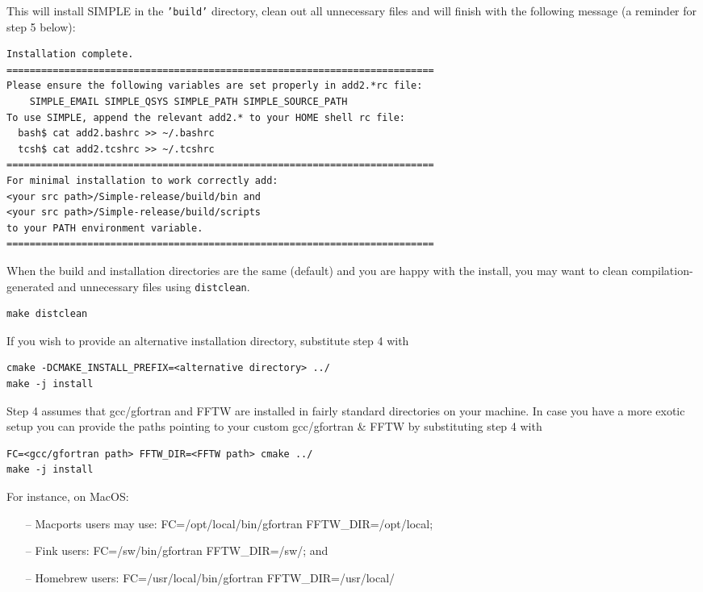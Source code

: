 \documentclass[a4paper,11pt]{article}
\begin{document}
\noindent{}This will install SIMPLE in the \texttt{'build'} directory, clean out all unnecessary
files and will finish with the following message (a reminder for step 5 below):

\begin{Verbatim}[commandchars=+\[\],fontsize=\small,breaklines=true]
Installation complete.
==========================================================================
Please ensure the following variables are set properly in add2.*rc file:
    SIMPLE_EMAIL SIMPLE_QSYS SIMPLE_PATH SIMPLE_SOURCE_PATH
To use SIMPLE, append the relevant add2.* to your HOME shell rc file:
  bash$ cat add2.bashrc >> ~/.bashrc
  tcsh$ cat add2.tcshrc >> ~/.tcshrc
==========================================================================
For minimal installation to work correctly add:
<your src path>/Simple-release/build/bin and
<your src path>/Simple-release/build/scripts
to your PATH environment variable.
==========================================================================
\end{Verbatim}

\noindent{}When the build and installation directories are the same (default) and you are
happy with the install, you may want to clean compilation-generated and
unnecessary files using \texttt{distclean}.

\begin{Verbatim}[commandchars=+\[\],fontsize=\small,breaklines=true]
make distclean
\end{Verbatim}

\noindent{}If you wish to provide an alternative installation directory, substitute step 4 with

\begin{Verbatim}[commandchars=+\[\],fontsize=\small,breaklines=true]
cmake -DCMAKE_INSTALL_PREFIX=<alternative directory> ../
make -j install
\end{Verbatim}

\noindent{}Step 4 assumes that gcc/gfortran and FFTW are installed in fairly standard directories on your machine. In case you have a 
more exotic setup you can provide the paths pointing to your custom gcc/gfortran \& FFTW by substituting step 4 with

\begin{Verbatim}[commandchars=+\[\],fontsize=\small,breaklines=true]
FC=<gcc/gfortran path> FFTW_DIR=<FFTW path> cmake ../
make -j install
\end{Verbatim}

\noindent{}For instance, on MacOS:
\begin{itemize}
	\item[--] Macports users may use: FC=/opt/local/bin/gfortran FFTW\_DIR=/opt/local;
	\item[--] Fink users: FC=/sw/bin/gfortran FFTW\_DIR=/sw/; and
	\item[--] Homebrew users: FC=/usr/local/bin/gfortran FFTW\_DIR=/usr/local/
\end{itemize}
\end{document}
